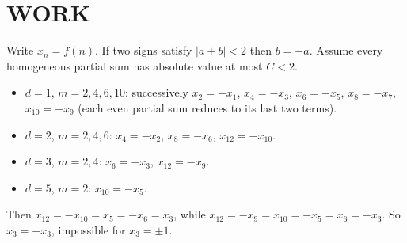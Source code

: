 \section{WORK}
Write $x_n=f(n)$. If two signs satisfy $|a+b|<2$ then $b=-a$. Assume every homogeneous partial sum has absolute value at most $C<2$.
\begin{itemize}
\item $d=1$, $m=2,4,6,10$: successively $x_2=-x_1$, $x_4=-x_3$, $x_6=-x_5$, $x_8=-x_7$, $x_{10}=-x_9$ (each even partial sum reduces to its last two terms).
\item $d=2$, $m=2,4,6$: $x_4=-x_2$, $x_8=-x_6$, $x_{12}=-x_{10}$.
\item $d=3$, $m=2,4$: $x_6=-x_3$, $x_{12}=-x_9$.
\item $d=5$, $m=2$: $x_{10}=-x_5$.
\end{itemize}
Then $x_{12}=-x_{10}=x_5=-x_6=x_3$, while $x_{12}=-x_9=x_{10}=-x_5=x_6=-x_3$. So $x_3=-x_3$, impossible for $x_3=\pm1$.

